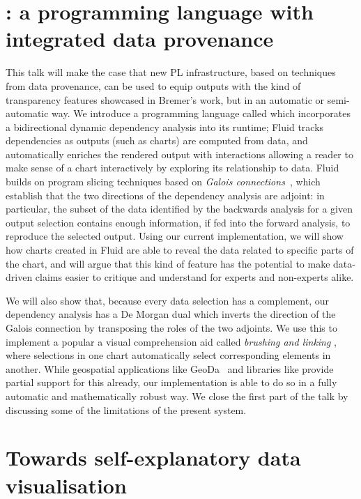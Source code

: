 \documentclass[a4paper,11pt]{article}
\begin{document}
\section{\Language: a programming language with integrated data provenance}

This talk will make the case that new PL infrastructure, based on techniques from data provenance, can be used
to equip outputs with the kind of transparency features showcased in Bremer's work, but in an automatic or
semi-automatic way. We introduce a programming language called  which
incorporates a bidirectional dynamic dependency analysis into its runtime; Fluid tracks dependencies as
outputs (such as charts) are computed from data, and automatically enriches the rendered output with
interactions allowing a reader to make sense of a chart interactively by exploring its relationship to data.
Fluid builds on program slicing techniques based on \emph{Galois connections}~\cite{perera12a, perera16d,
ricciotti17}, which establish that the two directions of the dependency analysis are adjoint: in particular,
the subset of the data identified by the backwards analysis for a given output selection contains enough
information, if fed into the forward analysis, to reproduce the selected output. Using our current
implementation, we will show how charts created in Fluid are able to reveal the data related to specific parts
of the chart, and will argue that this kind of feature has the potential to make data-driven claims easier to
critique and understand for experts and non-experts alike.

We will also show that, because every data selection has a complement, our dependency analysis has a De Morgan
dual which inverts the direction of the Galois connection by transposing the roles of the two adjoints. We use
this to implement a popular a visual comprehension aid called \emph{brushing and linking} \cite{becker87},
where selections in one chart automatically select corresponding elements in another. While geospatial
applications like GeoDa~\cite{anselin06} and libraries like 
provide partial support for this already, our implementation is able to do so in a fully automatic and
mathematically robust way. We close the first part of the talk by discussing some of the limitations of the
present system.

\pagebreak

\section{Towards self-explanatory data visualisation}
\end{document}
